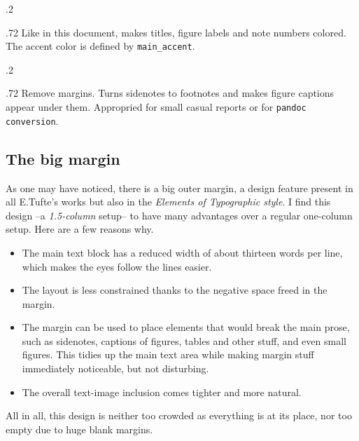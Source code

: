 \documentclass[
	raggedright,
	twoside,
	12pt,
	colorful,
]{tufte-style-article}
\begin{document}
\smallskip
\begin{minipagewithmarginpars}[t]{.2\textwidth}
	\raggedleft
\end{minipagewithmarginpars}\hfill%
\begin{minipagewithmarginpars}[t]{.72\textwidth}
	Like in this document, makes titles, figure labels and note numbers colored. The accent color is defined by \texttt{main\_accent}.
\end{minipagewithmarginpars}
\smallskip
\begin{minipagewithmarginpars}[t]{.2\textwidth}
	\raggedleft
\end{minipagewithmarginpars}\hfill%
\begin{minipagewithmarginpars}[t]{.72\textwidth}
	Remove margins. Turns sidenotes to footnotes and makes figure captions appear under them. Appropried for small casual reports or for \texttt{pandoc conversion}.
\end{minipagewithmarginpars}


\subsection{The big margin}

As one may have noticed, there is a big outer margin, a design feature present in all E.Tufte's works but also in the \textit{Elements of Typographic style}. I find this design --a \textit{1.5-column} setup-- to have many advantages over a regular one-column setup. Here are a few reasons why.
\begin{itemize}\tightlist
	\item The main text block has a reduced width of about thirteen words per line, which makes the eyes follow the lines easier.

	\item The layout is less constrained thanks to the negative space freed in the margin.

	\item The margin can be used to place elements that would break the main prose, such as sidenotes, captions of figures, tables and other stuff, and even small figures. This tidies up the main text area while making margin stuff immediately noticeable, but not disturbing.

	\item The overall text-image inclusion comes tighter and more natural.
\end{itemize}
All in all, this design is neither too crowded as everything is at its place, nor too empty due to huge blank margins.
\end{document}

